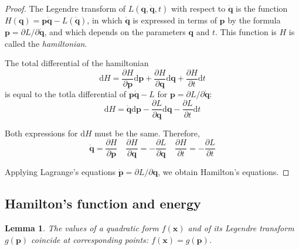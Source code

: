 \documentclass[conference]{IEEEtran}
\newtheorem{lemma}{Lemma}[section]
\theoremstyle{definition}
\theoremstyle{remark}
\begin{document}
    \begin{proof}
        The Legendre transform of $L(\mathbf{q}, \dot{\mathbf{q}}, t)$ with respect to $\dot{\mathbf{q}}$ is the function $H(\mathbf{q}) = \mathbf{p} \dot{\mathbf{q}} - L(\dot{\mathbf{q}})$, in which $\dot{\mathbf{q}}$ is expressed in terms of $\mathbf{p}$ by the formula $\mathbf{p} = \partial L / \partial \dot{\mathbf{q}}$, and which depends on the parameters $\mathbf{q}$ and $t$. This function is $H$ is called the \emph{hamiltonian}.

        The total differential of the hamiltonian
        \begin{equation*}
            \mathrm{d} H = \dfrac{\partial H}{\partial \mathbf{p}} \mathrm{d} \mathbf{p} + \dfrac{\partial H}{\partial \mathbf{q}} \mathrm{d} \mathbf{q} + \dfrac{\partial H}{\partial t} \mathrm{d} t
        \end{equation*}
        is equal to the totla differential of $\mathbf{p} \dot{\mathbf{q}} - L$ for  $\mathbf{p} = \partial L / \partial \dot{\mathbf{q}}$:
        \begin{equation*}
            \mathrm{d} H = \dot{\mathbf{q}} \mathrm{d} \mathbf{p} - \dfrac{\partial L}{\partial \mathbf{q}} \mathrm{d} \mathbf{q} - \dfrac{\partial L}{\partial t} \mathrm{d} t
        \end{equation*}

        Both expressions for $\mathrm{d} H$ must be the same. Therefore,
        \begin{equation*}
            \dot{\mathbf{q}} = \dfrac{\partial H}{\partial \mathbf{p}} \quad \dfrac{\partial H}{\partial \mathbf{q}} = -\dfrac{\partial L}{\partial \mathbf{q}} \quad \dfrac{\partial H}{\partial t} = -\dfrac{\partial L}{\partial t}
        \end{equation*}

        Applying Lagrange's equations $\dot{\mathbf{p}} = \partial L / \partial \mathbf{q}$, we obtain Hamilton's equations.
    \end{proof}

    \subsection{Hamilton's function and energy}
    \begin{lemma}
        The values of a quadratic form $f(\mathbf{x})$ and of its Legendre transform $g(\mathbf{p})$ coincide at corresponding points: $f(\mathbf{x}) = g(\mathbf{p})$.
    \end{lemma}
\end{document}
